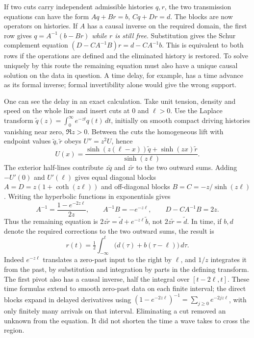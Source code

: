 If two cuts carry independent admissible histories $q,r$, the two transmission equations can have the form $Aq+Br=b$, $Cq+Dr=d$. The blocks are now operators on histories. If $A$ has a causal inverse on the required domain, the first row gives $q=A^{-1}(b-Br)$ \emph{while $r$ is still free}. Substitution gives the Schur complement equation $(D-CA^{-1}B)r=d-CA^{-1}b$. This is equivalent to both rows if the operations are defined and the eliminated history is restored. To solve uniquely by this route the remaining equation must also have a unique causal solution on the data in question. A time delay, for example, has a time advance as its formal inverse; formal invertibility alone would give the wrong support.

One can see the delay in an exact calculation. Take unit tension, density and speed on the whole line and insert cuts at $0$ and $\ell>0$. Use the Laplace transform $\widetilde q(z)=\int_0^\infty e^{-zt}q(t)\,dt$, initially on smooth compact driving histories vanishing near zero, $\Re z>0$. Between the cuts the homogeneous lift with endpoint values $\widetilde q,\widetilde r$ obeys $U''=z^2 U$, hence
\[
 U(x)=\frac{\sinh(z(\ell-x))\widetilde q+\sinh(zx)\widetilde r}{\sinh(z\ell)} .
\]
The exterior half-lines contribute $z\widetilde q$ and $z\widetilde r$ to the two outward sums. Adding $-U'(0)$ and $U'(\ell)$ gives equal diagonal blocks $A=D=z(1+\coth(z\ell))$ and off-diagonal blocks $B=C=-z/\sinh(z\ell)$. Writing the hyperbolic functions in exponentials gives
\[
 A^{-1}=\frac{1-e^{-2z\ell}}{2z},\qquad A^{-1}B=-e^{-z\ell},\qquad D-CA^{-1}B=2z .
\]
Thus the remaining equation is $2z\widetilde r=\widetilde d+e^{-z\ell}\widetilde b$, not $2z\widetilde r=\widetilde d$. In time, if $b,d$ denote the required corrections to the two outward sums, the result is
\[
 r(t)=\tfrac12\int_{-\infty}^t \big(d(\tau)+b(\tau-\ell)\big)\,d\tau .
\]
Indeed $e^{-z\ell}$ translates a zero-past input to the right by $\ell$, and $1/z$ integrates it from the past, by substitution and integration by parts in the defining transform. The first pivot also has a causal inverse, half the integral over $[t-2\ell,t]$. These time formulas extend to smooth zero-past data on each finite interval; the direct blocks expand in delayed derivatives using $(1-e^{-2z\ell})^{-1}=\sum_{j\geq0}e^{-2jz\ell}$, with only finitely many arrivals on that interval. Eliminating a cut removed an unknown from the equation. It did not shorten the time a wave takes to cross the region.
